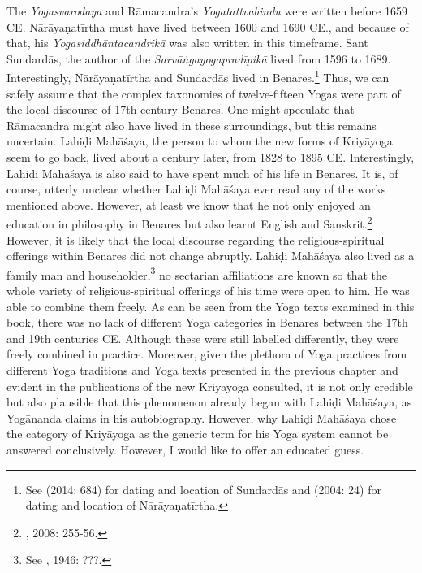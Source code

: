 The \textit{Yogasvarodaya} and Rāmacandra's \textit{Yogatattvabindu} were written before 1659 CE. Nārāyaṇatīrtha must have lived between 1600 and 1690 CE., and because of that, his \textit{Yogasiddhāntacandrikā} was also written in this timeframe. Sant Sundardās, the author of the \textit{Sarvāṅgayogapradīpikā} lived from 1596 to 1689. Interestingly, Nārāyaṇatīrtha and Sundardās lived in Benares.\footnote{See \citeauthor{burger2014sarvangayogapradipika} (2014: 684) for dating and location of Sundardās and \citeauthor{penna2004} (2004: 24) for dating and location of Nārāyaṇatīrtha.} Thus, we can safely assume that the complex taxonomies of twelve-fifteen Yogas were part of the local discourse of 17th-century Benares. One might speculate that Rāmacandra might also have lived in these surroundings, but this remains uncertain. Lahiḍi Mahāśaya, the person to whom the new forms of Kriyāyoga seem to go back, lived about a century later, from 1828 to 1895 CE. Interestingly, Lahiḍi Mahāśaya is also said to have spent much of his life in Benares. It is, of course, utterly unclear whether Lahiḍi Mahāśaya ever read any of the works mentioned above. However, at least we know that he not only enjoyed an education in philosophy in Benares but also learnt English and Sanskrit.\footnote{\citeauthor{jones2008encyclopedia}, 2008: 255-56.} However, it is likely that the local discourse regarding the religious-spiritual offerings within Benares did not change abruptly. Lahiḍi Mahāśaya also lived as a family man and householder,\footnote{See \citeauthor{autobioyogi}, 1946: ???.} no sectarian affiliations are known so that the whole variety of religious-spiritual offerings of his time were open to him. He was able to combine them freely. As can be seen from the Yoga texts examined in this book, there was no lack of different Yoga categories in Benares between the 17th and 19th centuries CE. Although these were still labelled differently, they were freely combined in practice. Moreover, given the plethora of Yoga practices from different Yoga traditions and Yoga texts presented in the previous chapter and evident in the publications of the new Kriyāyoga consulted, it is not only credible but also plausible that this phenomenon already began with Lahiḍi Mahāśaya, as Yogānanda claims in his autobiography. However, why Lahiḍi Mahāśaya chose the category of Kriyāyoga as the generic term for his Yoga system cannot be answered conclusively. However, I would like to offer an educated guess.

